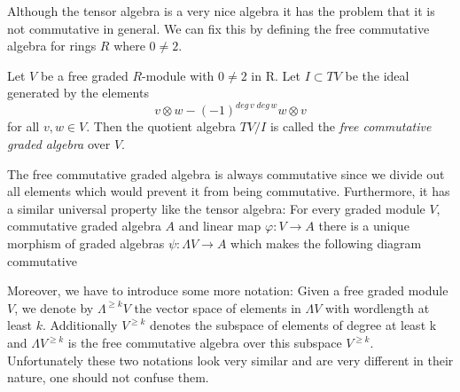 Although the tensor algebra is a very nice algebra it has the problem that it is not commutative in general. We can fix this by
defining the free commutative algebra for rings $R$ where $0 \neq 2$.

\begin{Definition}
 Let $V$ be a free graded $R$-module with $0 \neq 2$ in R. Let $I \subset TV$ be the ideal generated by the elements
 $$ v \otimes w - (-1)^{deg \, v \; deg \, w} w \otimes v$$
 for all $v,w \in V$. Then the quotient algebra $TV/I$ is called the \emph{free commutative graded algebra} over $V$.
\end{Definition}

The free commutative graded algebra is always commutative since we divide out all elements which would prevent it 
from being commutative. Furthermore, it has a similar universal property like the tensor algebra: For every graded
module $V$, commutative graded algebra $A$ and linear map $\varphi \colon V \to A$ there is a unique morphism of
graded algebras $\psi \colon \Lambda V \to A$ which makes the following diagram commutative

 

\centerline{
}



Moreover, we have to introduce some more notation: Given a free graded module $V$, we denote 
by $\Lambda^{\geq k} V$ the vector space of elements in $\Lambda V$ with wordlength at least $k$.
Additionally $V^{\geq k}$ denotes the subspace of elements of degree at least k and ${\Lambda V}^{\geq k}$ 
is the free commutative algebra over this subspace $V^{\geq k}$. Unfortunately these two notations look 
very similar and are very different in their nature, one should not confuse them.
